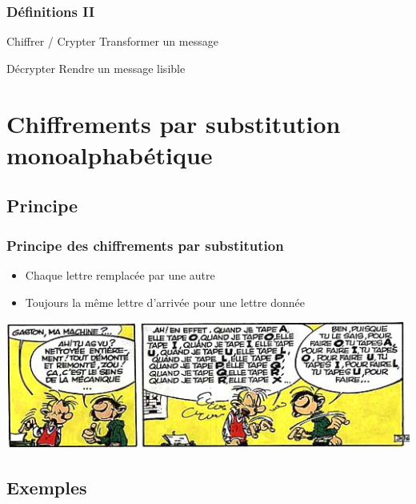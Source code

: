\documentclass[xcolor={dvipsnames}]{beamer}
\begin{document}
\begin{frame}
\frametitle{Définitions II}	

	\begin{block}{Chiffrer / Crypter}
		Transformer un message
	\end{block}\pause
	
	\begin{block}{Décrypter}
		Rendre un message lisible
	\end{block}
	

\end{frame}
\section{Chiffrements par substitution monoalphabétique}

\subsection{Principe}

\begin{frame}
\frametitle{Principe des chiffrements par substitution}

\begin{itemize}
	\item Chaque lettre remplacée par une autre
	\item Toujours la même lettre d'arrivée pour une lettre donnée
\end{itemize}

\begin{center}
	\includegraphics[scale=0.6]{gaston}
\end{center}
\end{frame}


\subsection{Exemples}
\end{document}
